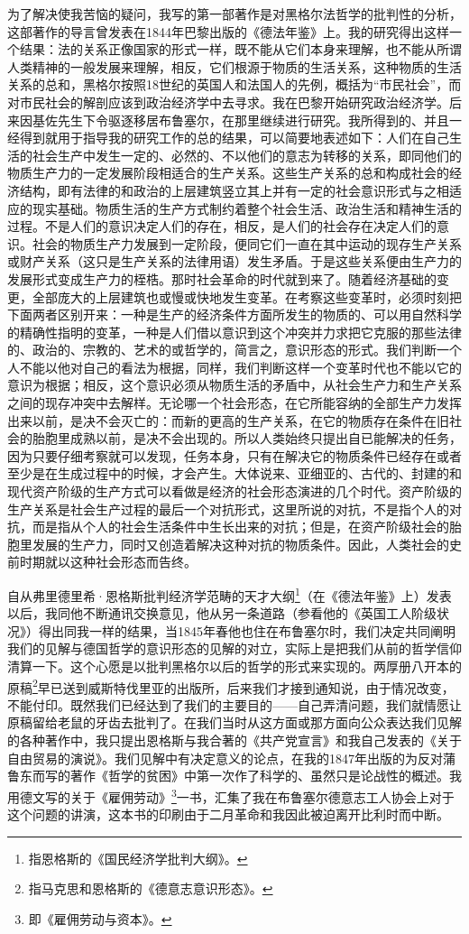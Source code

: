 \documentclass[a4paper,twoside,12pt]{ctexart}
\begin{document}
为了解决使我苦恼的疑问，我写的第一部著作是对黑格尔法哲学的批判性的分析，这部著作的导言曾发表在1844年巴黎出版的《德法年鉴》上。我的研究得出这样一个结果：法的关系正像国家的形式一样，既不能从它们本身来理解，也不能从所谓人类精神的一般发展来理解，相反，它们根源于物质的生活关系，这种物质的生活关系的总和，黑格尔按照18世纪的英国人和法国人的先例，概括为“市民社会”，而对市民社会的解剖应该到政治经济学中去寻求。我在巴黎开始研究政治经济学。后来因基佐先生下令驱逐移居布鲁塞尔，在那里继续进行研究。我所得到的、并且一经得到就用于指导我的研究工作的总的结果，可以简要地表述如下：人们在自己生活的社会生产中发生一定的、必然的、不以他们的意志为转移的关系，即同他们的物质生产力的一定发展阶段相适合的生产关系。这些生产关系的总和构成社会的经济结构，即有法律的和政治的上层建筑竖立其上并有一定的社会意识形式与之相适应的现实基础。物质生活的生产方式制约着整个社会生活、政治生活和精神生活的过程。不是人们的意识决定人们的存在，相反，是人们的社会存在决定人们的意识。社会的物质生产力发展到一定阶段，便同它们一直在其中运动的现存生产关系或财产关系（这只是生产关系的法律用语）发生矛盾。于是这些关系便由生产力的发展形式变成生产力的桎梏。那时社会革命的时代就到来了。随着经济基础的变更，全部庞大的上层建筑也或慢或快地发生变革。在考察这些变革时，必须时刻把下面两者区别开来：一种是生产的经济条件方面所发生的物质的、可以用自然科学的精确性指明的变革，一种是人们借以意识到这个冲突并力求把它克服的那些法律的、政治的、宗教的、艺术的或哲学的，简言之，意识形态的形式。我们判断一个人不能以他对自己的看法为根据，同样，我们判断这样一个变革时代也不能以它的意识为根据；相反，这个意识必须从物质生活的矛盾中，从社会生产力和生产关系之间的现存冲突中去解样。无论哪一个社会形态，在它所能容纳的全部生产力发挥出来以前，是决不会灭亡的：而新的更高的生产关系，在它的物质存在条件在旧社会的胎胞里成熟以前，是决不会出现的。所以人类始终只提出自已能解决的任务，因为只要仔细考察就可以发现，任务本身，只有在解决它的物质条件已经存在或者至少是在生成过程中的时候，才会产生。大体说来、亚细亚的、古代的、封建的和现代资产阶级的生产方式可以看做是经济的社会形态演进的几个时代。资产阶级的生产关系是社会生产过程的最后一个对抗形式，这里所说的对抗，不是指个人的对抗，而是指从个人的社会生活条件中生长出来的对抗；但是，在资产阶级社会的胎胞里发展的生产力，同时又创造着解决这种对抗的物质条件。因此，人类社会的史前时期就以这种社会形态而告终。

自从弗里德里希·恩格斯批判经济学范畴的天才大纲\footnote{指恩格斯的《国民经济学批判大纲》。}（在《德法年鉴》上）发表以后，我同他不断通讯交换意见，他从另一条道路（参看他的《英国工人阶级状况》）得出同我一样的结果，当1845年春他也住在布鲁塞尔时，我们决定共同阐明我们的见解与德国哲学的意识形态的见解的对立，实际上是把我们从前的哲学信仰清算一下。这个心愿是以批判黑格尔以后的哲学的形式来实现的。两厚册八开本的原稿\footnote{指马克思和恩格斯的《德意志意识形态》。}早已送到威斯特伐里亚的出版所，后来我们才接到通知说，由于情况改变，不能付印。既然我们已经达到了我们的主要目的——自己弄清问题，我们就情愿让原稿留给老鼠的牙齿去批判了。在我们当时从这方面或那方面向公众表达我们见解的各种著作中，我只提出恩格斯与我合著的《共产党宣言》和我自己发表的《关于自由贸易的演说》。我们见解中有决定意义的论点，在我的1847年出版的为反对蒲鲁东而写的著作《哲学的贫困》中第一次作了科学的、虽然只是论战性的概述。我用德文写的关于《雇佣劳动》\footnote{即《雇佣劳动与资本》。}一书，汇集了我在布鲁塞尔德意志工人协会上对于这个问题的讲演，这本书的印刷由于二月革命和我因此被迫离开比利时而中断。
\end{document}
